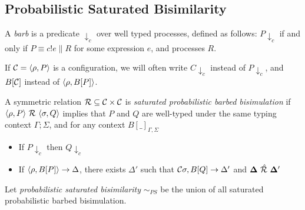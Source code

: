 \subsection{Probabilistic Saturated Bisimilarity}

\begin{definition}[Barb]
	A \emph{barb} is a predicate $\downarrow_{c}$ over well typed processes, defined as follows: $P \downarrow_{c}$ if and only if $P \equiv c!e \parallel R$ for some expression $e$, and processes $R$.
\end{definition}


If $\mathcal{C} = \langle\rho, P\rangle$ is a configuration, we will often write $C\downarrow_c$ instead of $P\downarrow_c$, and $B[\mathcal{C}]$ instead of $\langle\rho, B[P]\rangle$.

\begin{definition}
	A symmetric relation $\mathcal{R} \subseteq \mathcal{C} \times \mathcal{C}$ is \emph{saturated probabilistic barbed bisimulation} if $\confw{\rho, P} \ \rel\ \confw{\sigma, Q}$ implies that $P$ and $Q$  are well-typed under the same typing context $\Gamma; \Sigma$, and for any context $B[\_]_{\Gamma, \Sigma}$
	\begin{itemize}
		\item If $P \downarrow_{c}$ then $Q \downarrow_{c}$
		\item If $\langle\rho, B[P]\rangle \rightarrow \Delta$, there exists $\Delta' $ such that $\mathcal{C}{\sigma, B[Q]} \rightarrow \Delta'$ and $\mathbf{\Delta}\ \sqlift{\rel}\ \mathbf{\Delta'}$
	\end{itemize}
	Let \emph{probabilistic saturated bisimilarity} $\sim_{PS}$ be the union of all saturated probabilistic barbed bisimulation.
\end{definition}



